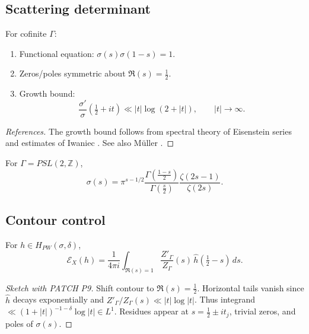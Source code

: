 \subsection{Scattering determinant}

\begin{theorem}
\label{thm:sigma}
For cofinite $\Gamma$:
\begin{enumerate}[label=(\roman*)]
\item Functional equation: $\sigma(s)\sigma(1-s)=1$.
\item Zeros/poles symmetric about $\Re(s)=\tfrac12$.
\item Growth bound:
\[
\frac{\sigma'}{\sigma}\!\left(\tfrac12+it\right) \ll |t|\log(2+|t|), \qquad |t|\to\infty.
\]
\end{enumerate}
\end{theorem}

\begin{proof}[References]
The growth bound follows from spectral theory of Eisenstein series 
and estimates of Iwaniec \cite[Thm.~6.13]{Iwaniec2002}.  
See also Müller \cite{Muller2005}.
\end{proof}

\begin{example}
For $\Gamma=PSL(2,\mathbb{Z})$,
\[
\sigma(s) = \pi^{s-1/2} \frac{\Gamma(\tfrac{1-s}{2})}{\Gamma(\tfrac{s}{2})}
\frac{\zeta(2s-1)}{\zeta(2s)}.
\]
\end{example}

\subsection{Contour control}

\begin{theorem}
\label{thm:contour}
For $h\in H_{PW}(\sigma,\delta)$,
\[
\mathcal{E}_X(h) = \frac{1}{4\pi i}\int_{\Re(s)=1} 
\frac{Z'_\Gamma}{Z_\Gamma}(s)\,\widehat{h}\!\left(\tfrac12-s\right)\,ds.
\]
\end{theorem}

\begin{proof}[Sketch with PATCH P9]
Shift contour to $\Re(s)=\tfrac12$.  
Horizontal tails vanish since $\widehat{h}$ decays exponentially and
$Z'_\Gamma/Z_\Gamma(s) \ll |t|\log|t|$.  
Thus integrand $\ll (1+|t|)^{-1-\delta}\log|t| \in L^1$.  
Residues appear at $s=\tfrac12\pm it_j$, trivial zeros, and poles of $\sigma(s)$.
\end{proof}

